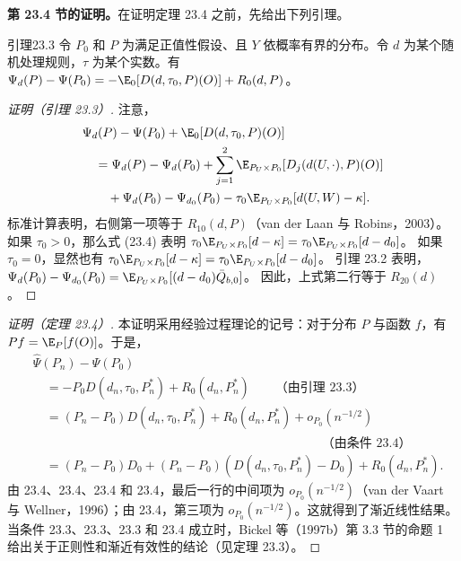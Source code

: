 \noindent\textbf{第 23.4 节的证明。}在证明定理 23.4 之前，先给出下列引理。

\begin{bookresult}{引理}{23.3}
令 $P_0$ 和 $P$ 为满足正值性假设、且 $Y$ 依概率有界的分布。令 $d$ 为某个随机处理规则，$\tau$ 为某个实数。有
$\Psi_d(P)-\Psi(P_0)=-\E_0[D(d,\tau_0,P)(O)]+R_0(d,P)$。
\end{bookresult}

\begin{proof}[证明（引理 23.3）]
注意，
\[
\begin{aligned}
 &\Psi_d(P)-\Psi(P_0)+\E_0[D(d,\tau_0,P)(O)]\\
 &\quad=\Psi_d(P)-\Psi_d(P_0)+\sum_{j=1}^2\E_{P_U\times P_0}[D_j(d(U,\cdot),P)(O)]\\
 &\qquad+\Psi_d(P_0)-\Psi_{d_0}(P_0)-\tau_0\E_{P_U\times P_0}[d(U,W)-\kappa].
\end{aligned}
\]
标准计算表明，右侧第一项等于 $R_{10}(d,P)$（van der Laan 与 Robins，2003）。如果 $\tau_0>0$，那么式 (23.4) 表明
$\tau_0\E_{P_U\times P_0}[d-\kappa]=\tau_0\E_{P_U\times P_0}[d-d_0]$。
如果 $\tau_0=0$，显然也有
$\tau_0\E_{P_U\times P_0}[d-\kappa]=\tau_0\E_{P_U\times P_0}[d-d_0]$。
引理 23.2 表明，$\Psi_d(P_0)-\Psi_{d_0}(P_0)=\E_{P_U\times P_0}[(d-d_0)\bar Q_{b,0}]$。
因此，上式第二行等于 $R_{20}(d)$。
\end{proof}

\begin{proof}[证明（定理 23.4）]
本证明采用经验过程理论的记号：对于分布 $P$ 与函数 $f$，有 $Pf=\E_P[f(O)]$。于是，
\[
\begin{aligned}
 &\hat\Psi(P_n)-\Psi(P_0)\\
 &\quad=-P_0D(d_n,\tau_0,P_n^*)+R_0(d_n,P_n^*)
 \qquad\text{（由引理 23.3）}\\
 &\quad=(P_n-P_0)D(d_n,\tau_0,P_n^*)+R_0(d_n,P_n^*)+o_{P_0}(n^{-1/2})\\
 &\hspace{23em}\text{（由条件 23.4）}\\
 &\quad=(P_n-P_0)D_0+(P_n-P_0)(D(d_n,\tau_0,P_n^*)-D_0)+R_0(d_n,P_n^*).
\end{aligned}
\]
由 23.4、23.4、23.4 和 23.4，最后一行的中间项为 $o_{P_0}(n^{-1/2})$（van der Vaart 与 Wellner，1996）；由 23.4，第三项为 $o_{P_0}(n^{-1/2})$。这就得到了渐近线性结果。当条件 23.3、23.3、23.3 和 23.4 成立时，Bickel 等（1997b）第 3.3 节的命题 1 给出关于正则性和渐近有效性的结论（见定理 23.3）。
\end{proof}
